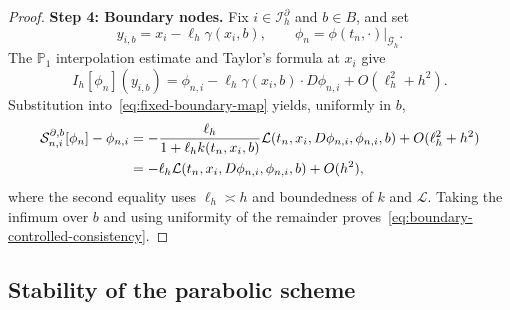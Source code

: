 \documentclass[10pt,a4paper]{amsart}
\newcommand{\cG}{\mathcal{G}}
\newcommand{\cS}{\mathcal{S}}
\begin{document}
\begin{proof}
		\medskip
		\noindent\textbf{Step 4: Boundary nodes.}
		Fix $i\in\mathcal I_h^\partial$ and $b\in B$, and set
		\[
		y_{i,b}=x_i-\ell_h\gamma(x_i,b),\qquad
		\phi_n=\phi(t_n,\cdot)|_{\cG_h}.
		\]
		The $\mathbb P_1$ interpolation estimate and Taylor's formula at $x_i$
		give
		\[
		I_h[\phi_n](y_{i,b})
		=\phi_{n,i}-\ell_h\gamma(x_i,b)\cdot D\phi_{n,i}
		+O(\ell_h^2+h^2).
		\]
		Substitution into~\eqref{eq:fixed-boundary-map} yields, uniformly in $b$,
		\begin{align}
			\cS_{n,i}^{\partial,b}[\phi_n]-\phi_{n,i}
			&=-\frac{\ell_h}{1+\ell_h k(t_n,x_i,b)}
			\mathcal L(t_n,x_i,D\phi_{n,i},\phi_{n,i},b)
			+O(\ell_h^2+h^2)
			\notag\\
			&=-\ell_h\mathcal L(t_n,x_i,D\phi_{n,i},\phi_{n,i},b)+O(h^2),
			\label{eq:boundary-fixed-consistency}
		\end{align}
		where the second equality uses $\ell_h\asymp h$ and boundedness of $k$ and
		$\mathcal L$.  Taking the infimum over $b$ and using uniformity of the
		remainder proves~\eqref{eq:boundary-controlled-consistency}.
	\end{proof}
	
	\subsection{Stability of the parabolic scheme}
	
\end{document}
